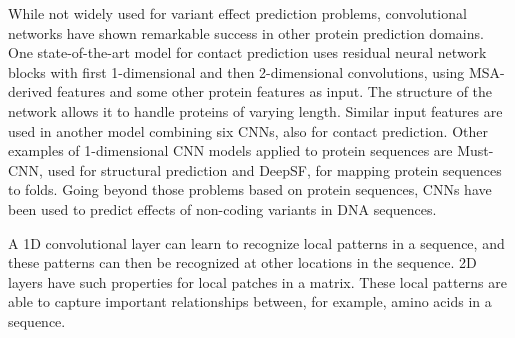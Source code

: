 While not widely used for variant effect prediction problems, convolutional networks have shown remarkable success in other protein prediction domains. One state-of-the-art model for contact prediction\cite{wang2017accurate} uses residual neural network blocks with first 1-dimensional and then 2-dimensional convolutions, using MSA-derived features and some other protein features as input. The structure of the network allows it to handle proteins of varying length. Similar input features are used in another model combining six CNNs, also for contact prediction.\cite{adhikari2017dncon2} Other examples of 1-dimensional CNN models applied to protein sequences are Must-CNN, used for structural prediction\cite{lin2016must} and DeepSF, for mapping protein sequences to folds.\cite{hou2017deepsf} Going beyond those problems based on protein sequences, CNNs have been used to predict effects of non-coding variants in DNA sequences.\cite{zhou2015predicting}

A 1D convolutional layer can learn to recognize local patterns in a sequence, and these patterns can then be recognized at other locations in the sequence. 2D layers have such properties for local patches in a matrix. These local patterns are able to capture important relationships between, for example, amino acids in a sequence.





